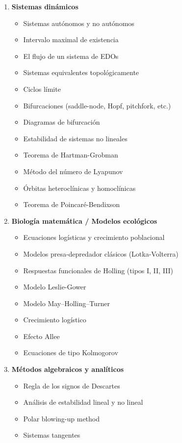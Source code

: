 \begin{enumerate}
	\item \textbf{Sistemas dinámicos}
	\begin{itemize}
		\item Sistemas autónomos y no autónomos \checkmark
		\item Intervalo maximal de existencia \checkmark \cite[p. 89-90]{perko2001}
		\item El flujo de un sistema de EDOs \checkmark \cite[p. 96]{perko2001}
		\item Sistemas equivalentes topológicamente \checkmark \cite[p. 155]{strogatz2014}
		\item Ciclos límite \checkmark \cite[p. 196]{strogatz2014}
		\item Bifurcaciones (saddle-node, Hopf, pitchfork, etc.) \cite[p. 118]{guckenheimer1983} \cite[p. 44, 241]{strogatz2014}
		\item Diagramas de bifurcación
		\item Estabilidad de sistemas no lineales
		\item Teorema de Hartman-Grobman \checkmark \cite[p. 120-121]{perko2001}
		\item Método del número de Lyapunov
		\item Órbitas heteroclínicas y homoclínicas \checkmark \cite[p. 150]{teschl2012}
		\item Teorema de Poincaré-Bendixson \checkmark \cite[p. 203]{strogatz2014}
	\end{itemize}
	
	\item \textbf{Biología matemática / Modelos ecológicos}
	\begin{itemize}
		\item Ecuaciones logísticas y crecimiento poblacional
		\item Modelos presa-depredador clásicos (Lotka-Volterra)
		\item Respuestas funcionales de Holling (tipos I, II, III)
		\item Modelo Leslie-Gower
		\item Modelo May–Holling–Turner
		\item Crecimiento logístico
		\item Efecto Allee
		\item Ecuaciones de tipo Kolmogorov
	\end{itemize}
	
	\item \textbf{Métodos algebraicos y analíticos}
	\begin{itemize}
		\item Regla de los signos de Descartes
		\item Análisis de estabilidad lineal y no lineal
		\item Polar blowing-up method
		\item Sistemas tangentes
	\end{itemize}
\end{enumerate}

